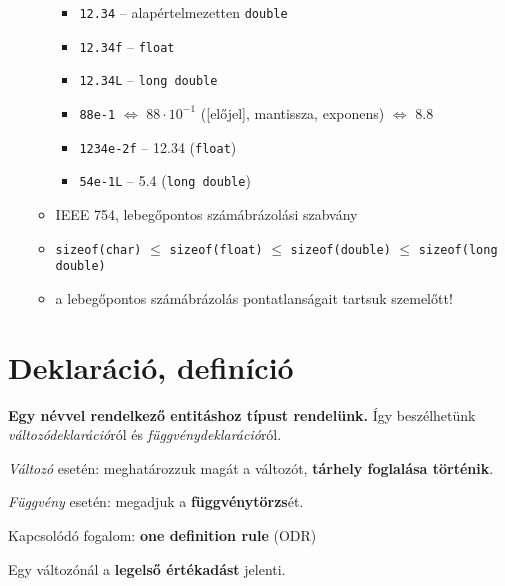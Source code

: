 \documentclass[a4paper, 11pt, oneside]{book}
\begin{document}
\begin{itemize}
\begin{itemize}
\begin{itemize}
			\item \verb*|12.34| -- alapértelmezetten \verb*|double|
			\item \verb*|12.34f| -- \verb|float|
			\item \verb*|12.34L| -- \verb|long double|
			\item \verb*|88e-1| $\Longleftrightarrow$ $88 \cdot 10^{-1}$ ([előjel], mantissza, exponens) $\Longleftrightarrow$ 8.8
			\item \verb*|1234e-2f| -- 12.34 (\verb*|float|)
			\item \verb*|54e-1L| -- 5.4 (\verb|long double|)
		\end{itemize}
		\item IEEE 754, lebegőpontos számábrázolási szabvány
		\item \verb*|sizeof(char)| $\leq$ \verb*|sizeof(float)| $\leq$ \verb*|sizeof(double)| $\leq$ \verb|sizeof(long double)|
		\item a lebegőpontos számábrázolás pontatlanságait tartsuk szemelőtt!
	\end{itemize}
\end{itemize}


\section{Deklaráció, definíció}

\begin{tcolorbox}[title={\textbf{Deklaráció}}]
	\textbf{Egy névvel rendelkező entitáshoz típust rendelünk.} Így beszélhetünk \textit{változódeklaráció}ról és \textit{függvénydeklaráció}ról.
\end{tcolorbox}

\begin{tcolorbox}[title={\textbf{Definíció}}]
	\textit{Változó} esetén: meghatározzuk magát a változót, \textbf{tárhely foglalása történik}.
	
	\textit{Függvény} esetén: megadjuk a \textbf{függvénytörzs}ét.
	
	Kapcsolódó fogalom: \textbf{one definition rule} (ODR)
\end{tcolorbox}

\begin{tcolorbox}[title={\textbf{Inicializáció}}]
	Egy változónál a \textbf{legelső értékadást} jelenti.
\end{tcolorbox}
\end{document}
